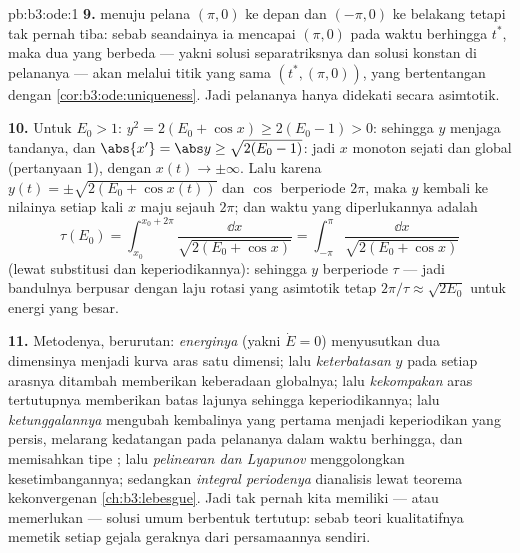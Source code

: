 \begin{solution}{pb:b3:ode:1}
\textbf{9.}  menuju pelana $(\pi, 0)$ ke depan
dan $(-\pi, 0)$ ke belakang tetapi tak pernah tiba: sebab seandainya ia mencapai
$(\pi, 0)$ pada waktu berhingga $t^*$, maka dua  yang berbeda
--- yakni solusi separatriksnya dan solusi konstan
di pelananya --- akan melalui titik yang sama
$(t^*, (\pi, 0))$, yang bertentangan dengan
\cref{cor:b3:ode:uniqueness}. Jadi pelananya hanya didekati
secara asimtotik.

\textbf{10.} Untuk $E_0 > 1$: $y^2 = 2(E_0 + \cos x) \geq
2(E_0 - 1) > 0$: sehingga $y$ menjaga tandanya, dan $\abs{x'} = \abs y
\geq \sqrt{2(E_0 - 1)}$: jadi $x$ monoton sejati dan global
(pertanyaan 1), dengan $x(t) \to \pm\infty$. Lalu karena $y(t) =
\pm\sqrt{2(E_0 + \cos x(t))}$ dan $\cos$ berperiode $2\pi$,
maka $y$ kembali ke nilainya setiap kali $x$ maju sejauh $2\pi$;
dan waktu yang diperlukannya adalah
\[
\tau(E_0) = \int_{x_0}^{x_0 + 2\pi}\frac{\dd
x}{\sqrt{2(E_0 + \cos x)}} =
\int_{-\pi}^{\pi}\frac{\dd x}{\sqrt{2(E_0 + \cos x)}}
\]
(lewat substitusi dan keperiodikannya): sehingga $y$ berperiode $\tau$ ---
jadi bandulnya berpusar dengan laju rotasi yang asimtotik tetap
$2\pi/\tau \approx \sqrt{2E_0}$ untuk energi yang besar.

\textbf{11.} Metodenya, berurutan: \emph{energinya} (yakni $\dot E =
0$) menyusutkan  dua dimensinya menjadi kurva aras
satu dimensi; lalu \emph{keterbatasan} $y$ pada setiap arasnya ditambah
 memberikan keberadaan globalnya; lalu
\emph{kekompakan} aras tertutupnya memberikan batas lajunya
sehingga keperiodikannya; lalu \emph{ketunggalannya} mengubah
kembalinya yang pertama menjadi keperiodikan yang persis, melarang kedatangan
pada pelananya dalam waktu berhingga, dan memisahkan tipe ;
lalu \emph{pelinearan dan Lyapunov} menggolongkan kesetimbangannya;
sedangkan \emph{integral periodenya} dianalisis lewat teorema kekonvergenan
\cref{ch:b3:lebesgue}. Jadi tak pernah kita memiliki --- atau
memerlukan --- solusi umum berbentuk tertutup: sebab
teori kualitatifnya memetik setiap gejala geraknya
dari persamaannya sendiri.


\end{solution}
